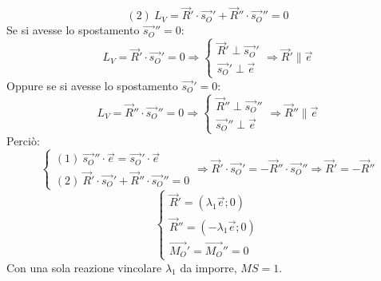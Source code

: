 \documentclass{article}
\begin{document}
\begin{adjustwidth}{2in}{}
\begin{enumerate}
				\[
		(2)~L_{V} = \vec{R}' \cdot \vec{s_O}'+ \vec{R}'' \cdot \vec{s_O}'' = 0
			\]	
			Se si avesse lo spostamento $\vec{s_O}'' = 0$:
				\[
			L_{V} = \vec{R}' \cdot \vec{s_O}' = 0 \Rightarrow \begin{cases}
\vec{R}' \perp \vec{s_O}'\\
\vec{s_O}' \perp \vec{e} 
			\end{cases} \Rightarrow  \vec{R}' \parallel \vec{e}
			\]	
			Oppure se si avesse lo spostamento $\vec{s_O}' = 0$:
			\[
			L_{V} = \vec{R}'' \cdot \vec{s_O}'' = 0 \Rightarrow \begin{cases}
				\vec{R}'' \perp \vec{s_O}''\\
				\vec{s_O}'' \perp \vec{e} 
			\end{cases} \Rightarrow  \vec{R}'' \parallel \vec{e}
			\]	
			Perciò:
			\[
			\begin{cases}
(1)~\vec{s_O}'' \cdot \vec{e} = \vec{s_O}' \cdot \vec{e} \\
(2)~\vec{R}' \cdot \vec{s_O}' + \vec{R}'' \cdot \vec{s_O}'' = 0
			\end{cases} \Rightarrow \vec{R}' \cdot \vec{s_O}' = - \vec{R}'' \cdot \vec{s_O}'' \Rightarrow  \vec{R}' = -\vec{R}''
			\]
			\[
			\begin{cases}
				\vec{R}' = (\lambda_1 \vec{e}; 0) \\
				\vec{R}'' = (-\lambda_1 \vec{e}; 0) \\
				\vec{M_O}'= \vec{M_O}'' = 0
			\end{cases}
			\]
Con una sola reazione vincolare $\lambda_1$ da imporre, $MS = 1$. \newline


\end{enumerate}
\end{adjustwidth}
\end{document}
